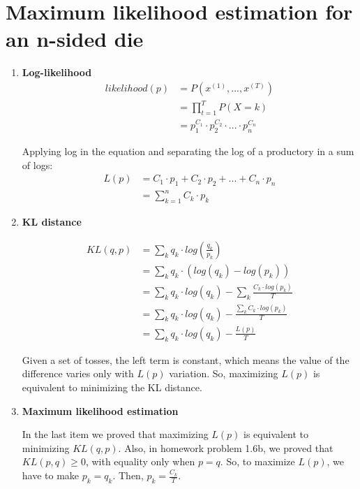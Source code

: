 \documentclass[11]{article}
\begin{document}
\section{Maximum likelihood estimation for an n-sided die}
\begin{enumerate}[label=(\alph*)]
\item{\textbf{Log-likelihood}}
\begin{align*}
likelihood(p) &= P({x^{(1)}, ..., x^{(T)}})\\
&= \prod_{t=1}^T P(X=k) \\
&= p_1^{C_1} \cdot p_2^{C_2} \cdot ... \cdot p_n^{C_n}
\end{align*}

Applying log in the equation and separating the log of a productory in a sum of logs:
\begin{align*}
L(p) &= C_1 \cdot p_1 + C_2 \cdot p_2 + ... + C_n \cdot p_n \\
&= \sum_{k=1}^n C_k \cdot p_k
\end{align*}

\item{\textbf{KL distance}}

\begin{align*}
KL(q,p) &= \sum_k q_k \cdot log \left( \frac{q_k}{p_k} \right)\\
&= \sum_k q_k \cdot (log(q_k) - log(p_k))\\
&= \sum_k q_k \cdot log(q_k) - \sum_k \frac{C_k \cdot log(p_k)}{T}\\
&= \sum_k q_k \cdot log(q_k) - \frac{\sum_k C_k \cdot log(p_k)}{T}\\
&= \sum_k q_k \cdot log(q_k) - \frac{L(p)}{T}
\end{align*}

Given a set of tosses, the left term is constant, which means the value of the difference varies only with $L(p)$ variation. So, maximizing $L(p)$ is equivalent to minimizing the KL distance.

\item{\textbf{Maximum likelihood estimation}}

In the last item we proved that maximizing $L(p)$ is equivalent to minimizing $KL(q,p)$. Also, in homework problem 1.6b, we proved that $KL(p,q) \geq 0$, with equality only when $p = q$. So, to maximize $L(p)$, we have to make $p_k=q_k$. Then, $p_k = \frac{C_k}{T}$.
\end{enumerate}
\end{document}
